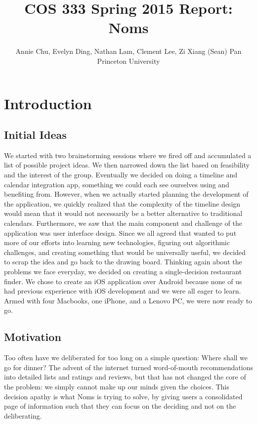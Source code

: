 \documentclass[12pt]{article}
\begin{document}
	
\title{\textbf{COS 333 Spring 2015 Report: Noms}}
	
\author{
		Annie Chu, Evelyn Ding, Nathan Lam, Clement Lee, Zi Xiang (Sean) Pan \\
		Princeton University}
	
\maketitle	
\section{Introduction}
\subsection{Initial Ideas}
We started with two brainstorming sessions where we fired off and accumulated a list of possible project ideas. We then narrowed down the list based on feasibility and the interest of the group. Eventually we decided on doing a timeline and calendar integration app, something we could each see ourselves using and benefiting from. However, when we actually started planning the development of the application, we quickly realized that the complexity of the timeline design would mean that it would not necessarily be a better alternative to traditional calendars. Furthermore, we saw that the main component and challenge of the application was user interface design. Since we all agreed that wanted to put more of our efforts into learning new technologies, figuring out algorithmic challenges, and creating something that would be universally useful, we decided to scrap the idea and go back to the drawing board. Thinking again about the problems we face everyday, we decided on creating a single-decision restaurant finder. We chose to create an iOS application over Android because none of us had previous experience with iOS development and we were all eager to learn. Armed with four Macbooks, one iPhone, and a Lenovo PC, we were now ready to go.

\subsection{Motivation}
Too often have we deliberated for too long on a simple question: Where shall we go for dinner? The advent of the internet turned word-of-mouth recommendations into detailed lists and ratings and reviews, but that has not changed the core of the problem: we simply cannot make up our minds given the choices. This decision apathy is what Noms is trying to solve, by giving users a consolidated page of information such that they can focus on the deciding and not on the deliberating.
\end{document}
